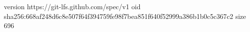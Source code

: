 version https://git-lfs.github.com/spec/v1
oid sha256:668af248d6c8e507f64f394759fe98f7bea851f640f52999a386b1b0c5c367c2
size 696
